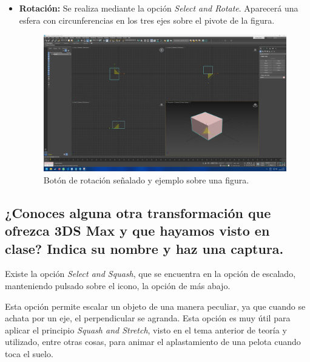 \documentclass{article}
\begin{document}
\begin{itemize}
    \item \textbf{Rotación: }Se realiza mediante la opción \textit{Select and Rotate}. Aparecerá una esfera con circunferencias en los tres ejes sobre el pivote de la figura.
    
    \begin{figure}[H]
        \centering
        \includegraphics[width=\textwidth]{imagenes/scale.png}
        \caption{Botón de rotación señalado y ejemplo sobre una figura.}
     \end{figure}    
\end{itemize}

\subsection{¿Conoces alguna otra transformación que ofrezca 3DS Max y que hayamos visto en clase? Indica su nombre y haz una captura.}

Existe la opción \textit{Select and Squash}, que se encuentra en la opción de escalado, manteniendo pulsado sobre el icono, la opción de más abajo.

\bigskip

Esta opción permite escalar un objeto de una manera peculiar, ya que cuando se achata por un eje, el perpendicular se agranda. Esta opción es muy útil para aplicar el principio \textit{Squash and Stretch}, visto en el tema anterior de teoría y utilizado, entre otras cosas, para animar el aplastamiento de una pelota cuando toca el suelo.
\end{document}
